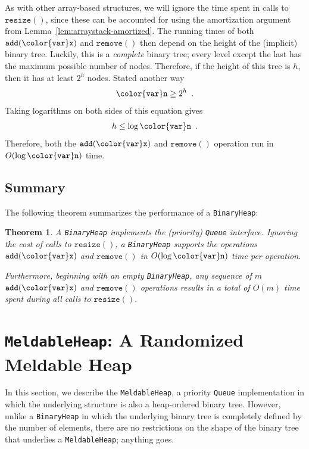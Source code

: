 \documentclass[10pt]{book}
\newcommand{\seclabel}[1]{\label{sec:#1}}
\theoremstyle{plain}
\newtheorem{thm}{Theorem}[chapter]
\newcommand{\thmlabel}[1]{\label{thm:#1}}
\newcommand{\lemref}[1]{Lemma~\ref{lem:#1}}
\theoremstyle{definition}
\begin{document}
As with other array-based structures, we will ignore the time spent in
calls to \ensuremath{\mathtt{resize()}}, since these can be accounted for using the amortization
argument from \lemref{arraystack-amortized}.  The running times of
both \ensuremath{\mathtt{add({\color{var}x})}} and \ensuremath{\mathtt{remove()}} then depend on the height of the (implicit)
binary tree.  Luckily, this is a \emph{complete}
%
%
binary tree;  every level
except the last has the maximum possible number of nodes.  Therefore,
if the height of this tree is $h$, then it has at least $2^h$ nodes.
Stated another way
\[
  \ensuremath{\mathtt{{\color{var}n}}} \ge 2^h \enspace .
\]  
Taking logarithms on both sides of this equation gives
\[
   h \le \log \ensuremath{\mathtt{{\color{var}n}}} \enspace .
\]
Therefore, both the \ensuremath{\mathtt{add({\color{var}x})}} and \ensuremath{\mathtt{remove()}} operation run in $O(\log \ensuremath{\mathtt{{\color{var}n}}})$ time.

\subsection{Summary}

The following theorem summarizes the performance of a \texttt{BinaryHeap}:

\begin{thm}\thmlabel{binaryheap}
  A \texttt{BinaryHeap} implements the (priority) \texttt{Queue} interface.  Ignoring
  the cost of calls to \ensuremath{\mathtt{resize()}}, a \texttt{BinaryHeap} supports the operations
  \ensuremath{\mathtt{add({\color{var}x})}} and \ensuremath{\mathtt{remove()}} in $O(\log \ensuremath{\mathtt{{\color{var}n}}})$ time per operation.

  Furthermore, beginning with an empty \texttt{BinaryHeap}, any sequence of $m$
  \ensuremath{\mathtt{add({\color{var}x})}} and \ensuremath{\mathtt{remove()}} operations results in a total of $O(m)$
  time spent during all calls to \ensuremath{\mathtt{resize()}}.
\end{thm}

\section{\texttt{MeldableHeap}: A Randomized Meldable Heap}
\seclabel{meldableheap}

%
In this section, we describe the \texttt{MeldableHeap}, a priority \texttt{Queue}
implementation in which the underlying structure is also a heap-ordered
binary tree.  However, unlike a \texttt{BinaryHeap} in which the underlying
binary tree is completely defined by the number of elements, there
are no restrictions on the shape of the binary tree that underlies
a \texttt{MeldableHeap}; anything goes.
\end{document}
